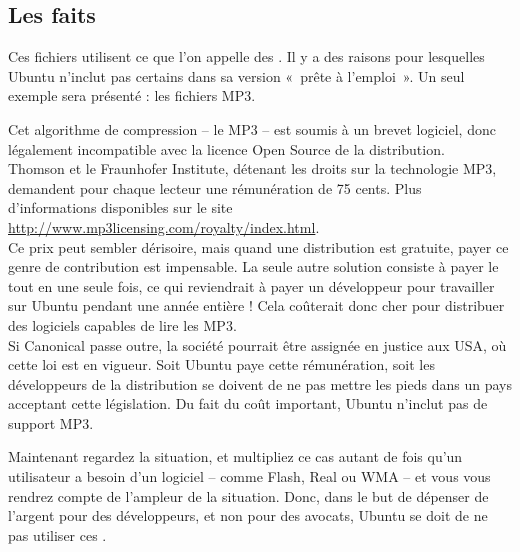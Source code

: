 \subsection{Les faits}
Ces fichiers utilisent ce que l'on appelle des . Il y a des raisons pour lesquelles Ubuntu n'inclut pas certains   dans sa version «~prête à l'emploi~». Un seul exemple sera présenté : les fichiers MP3. \par
Cet algorithme de compression -- le MP3 -- est soumis à un brevet logiciel, donc légalement incompatible avec la licence Open Source de la distribution.\\
Thomson et le Fraunhofer Institute, détenant les droits sur la technologie MP3, demandent pour chaque lecteur une rémunération de 75 cents. Plus d'informations disponibles sur le site \url{http://www.mp3licensing.com/royalty/index.html}.\\
Ce prix peut sembler dérisoire, mais quand une distribution est gratuite, payer ce genre de contribution est impensable. La seule autre solution consiste à payer le tout en une seule fois, ce qui reviendrait à payer un développeur pour travailler sur Ubuntu pendant une année entière ! Cela coûterait donc cher pour distribuer des logiciels capables de lire les MP3.\\
Si Canonical passe outre, la société pourrait être assignée en justice aux USA, où cette loi est en vigueur. Soit Ubuntu paye cette rémunération, soit les développeurs de la distribution se doivent de ne pas mettre les pieds dans un pays acceptant cette législation. Du fait du coût important, Ubuntu n'inclut pas de support MP3.\par
Maintenant regardez la situation, et multipliez ce cas autant de fois qu'un utilisateur a besoin d'un logiciel  -- comme Flash, Real ou WMA -- et vous vous rendrez compte de l'ampleur de la situation. Donc, dans le but de dépenser de l'argent pour des développeurs, et non pour des avocats, Ubuntu se doit de ne pas utiliser ces .\par
